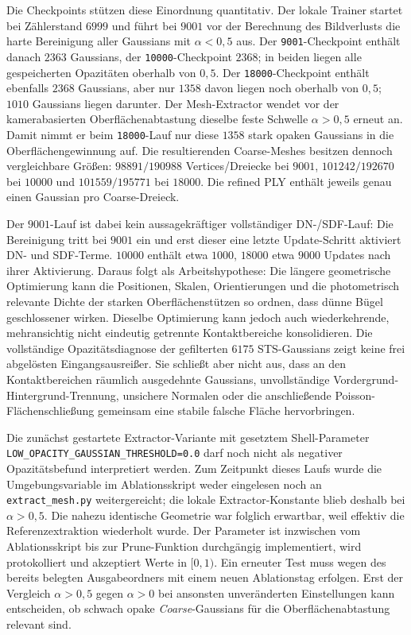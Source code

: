\documentclass[12pt,a4paper]{article}
\begin{document}
Die Checkpoints stützen diese Einordnung quantitativ. Der lokale Trainer startet bei Zählerstand $6999$ und führt bei $9001$ vor der Berechnung des Bildverlusts die harte Bereinigung aller Gaussians mit $\alpha<0{,}5$ aus. Der \texttt{9001}-Checkpoint enthält danach $2363$ Gaussians, der \texttt{10000}-Checkpoint $2368$; in beiden liegen alle gespeicherten Opazitäten oberhalb von $0{,}5$. Der \texttt{18000}-Checkpoint enthält ebenfalls $2368$ Gaussians, aber nur $1358$ davon liegen noch oberhalb von $0{,}5$; $1010$ Gaussians liegen darunter. Der Mesh-Extractor wendet vor der kamerabasierten Oberflächenabtastung dieselbe feste Schwelle $\alpha>0{,}5$ erneut an. Damit nimmt er beim \texttt{18000}-Lauf nur diese $1358$ stark opaken Gaussians in die Oberflächengewinnung auf. Die resultierenden Coarse-Meshes besitzen dennoch vergleichbare Größen: $98891/190988$ Vertices/Dreiecke bei $9001$, $101242/192670$ bei $10000$ und $101559/195771$ bei $18000$. Die refined PLY enthält jeweils genau einen Gaussian pro Coarse-Dreieck.

Der $9001$-Lauf ist dabei kein aussagekräftiger vollständiger DN-/SDF-Lauf: Die Bereinigung tritt bei $9001$ ein und erst dieser eine letzte Update-Schritt aktiviert DN- und SDF-Terme. $10000$ enthält etwa $1000$, $18000$ etwa $9000$ Updates nach ihrer Aktivierung. Daraus folgt als Arbeitshypothese: Die längere geometrische Optimierung kann die Positionen, Skalen, Orientierungen und die photometrisch relevante Dichte der starken Oberflächenstützen so ordnen, dass dünne Bügel geschlossener wirken. Dieselbe Optimierung kann jedoch auch wiederkehrende, mehransichtig nicht eindeutig getrennte Kontaktbereiche konsolidieren. Die vollständige Opazitätsdiagnose der gefilterten $6175$ STS-Gaussians zeigt keine frei abgelösten Eingangsausreißer. Sie schließt aber nicht aus, dass an den Kontaktbereichen räumlich ausgedehnte Gaussians, unvollständige Vordergrund-Hintergrund-Trennung, unsichere Normalen oder die anschließende Poisson-Flächenschließung gemeinsam eine stabile falsche Fläche hervorbringen.

Die zunächst gestartete Extractor-Variante mit gesetztem Shell-Parameter \texttt{LOW\_OPACITY\_GAUSSIAN\_THRESHOLD=0.0} darf noch nicht als negativer Opazitätsbefund interpretiert werden. Zum Zeitpunkt dieses Laufs wurde die Umgebungsvariable im Ablationsskript weder eingelesen noch an \texttt{extract\_mesh.py} weitergereicht; die lokale Extractor-Konstante blieb deshalb bei $\alpha>0{,}5$. Die nahezu identische Geometrie war folglich erwartbar, weil effektiv die Referenzextraktion wiederholt wurde. Der Parameter ist inzwischen vom Ablationsskript bis zur Prune-Funktion durchgängig implementiert, wird protokolliert und akzeptiert Werte in $[0,1)$. Ein erneuter Test muss wegen des bereits belegten Ausgabeordners mit einem neuen Ablationstag erfolgen. Erst der Vergleich $\alpha>0{,}5$ gegen $\alpha>0$ bei ansonsten unveränderten Einstellungen kann entscheiden, ob schwach opake \emph{Coarse}-Gaussians für die Oberflächenabtastung relevant sind.
\end{document}
